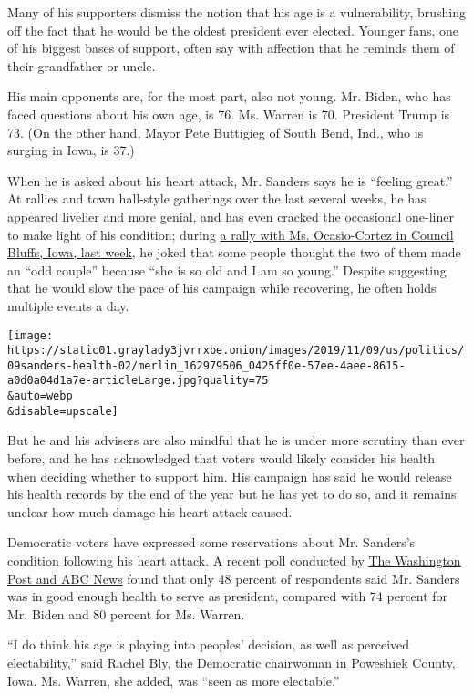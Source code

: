 Many of his supporters dismiss the notion that his age is a
vulnerability, brushing off the fact that he would be the oldest
president ever elected. Younger fans, one of his biggest bases of
support, often say with affection that he reminds them of their
grandfather or uncle.

His main opponents are, for the most part, also not young. Mr. Biden,
who has faced questions about his own age, is 76. Ms. Warren is 70.
President Trump is 73. (On the other hand, Mayor Pete Buttigieg of South
Bend, Ind., who is surging in Iowa, is 37.)

When he is asked about his heart attack, Mr. Sanders says he is
``feeling great.'' At rallies and town hall-style gatherings over the
last several weeks, he has appeared livelier and more genial, and has
even cracked the occasional one-liner to make light of his condition;
during
\href{https://www.nytimes3xbfgragh.onion/2019/11/10/us/politics/bernie-sanders-aoc-iowa.html}{a
rally with Ms. Ocasio-Cortez in Council Bluffs, Iowa, last week}, he
joked that some people thought the two of them made an ``odd couple''
because ``she is so old and I am so young.'' Despite suggesting that he
would slow the pace of his campaign while recovering, he often holds
multiple events a day.

\texttt{[image: https://static01.graylady3jvrrxbe.onion/images/2019/11/09/us/politics/09sanders-health-02/merlin\_162979506\_0425ff0e-57ee-4aee-8615-a0d0a04d1a7e-articleLarge.jpg?quality=75\\\&auto=webp\\\&disable=upscale]}

But he and his advisers are also mindful that he is under more scrutiny
than ever before, and he has acknowledged that voters would likely
consider his health when deciding whether to support him. His campaign
has said he would release his health records by the end of the year but
he has yet to do so, and it remains unclear how much damage his heart
attack caused.

Democratic voters have expressed some reservations about Mr. Sanders's
condition following his heart attack. A recent poll conducted by
\href{https://www.washingtonpost.com/context/context-card/eea087b6-ca22-4cd9-a254-6bdd49d000a4/}{The
Washington Post and ABC News} found that only 48 percent of respondents
said Mr. Sanders was in good enough health to serve as president,
compared with 74 percent for Mr. Biden and 80 percent for Ms. Warren.

``I do think his age is playing into peoples' decision, as well as
perceived electability,'' said Rachel Bly, the Democratic chairwoman in
Poweshiek County, Iowa. Ms. Warren, she added, was ``seen as more
electable.''

